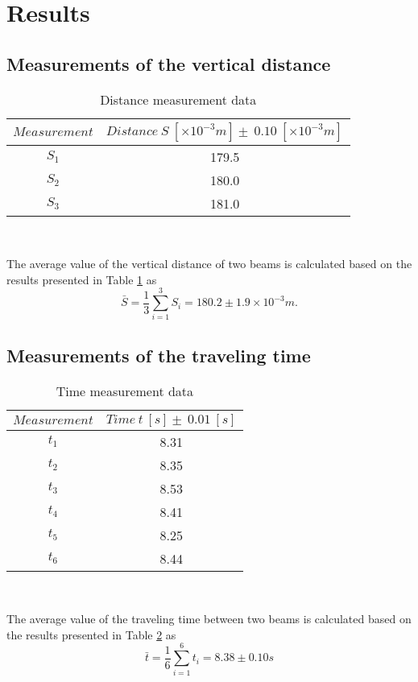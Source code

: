 \section{Results}
\subsection{Measurements of the vertical distance}
    \begin{table}[htbp]
        \centering
        \begin{tabular}{cc}
            \hline
            $Measurement$ & $Distance\ S\ [\times10^{-3}m] \pm\ 0.10\ [\times10^{-3}m]$\\
            \hline
            $S_1$ & 179.5\\
            $S_2$ & 180.0\\
            $S_3$ & 181.0\\     
            \hline
        \end{tabular}\\
        \caption{Distance measurement data}
        \label{distance}
    \end{table}
    The average value of the vertical distance of two beams is calculated  based on the results presented in Table \ref{distance} as
    \[
        \bar{S}=\frac{1}{3}\sum_{i=1}^{3}S_i=180.2\pm 1.9\times10^{-3}m.
    \]

\subsection{Measurements of the traveling time}
    \begin{table}[htbp]
        \centering
        \begin{tabular}{cc}
            \hline
            $Measurement$ & $Time\ t\ [s] \pm\ 0.01\ [s]$\\
            \hline
            $t_1$ & 8.31\\
            $t_2$ & 8.35\\
            $t_3$ & 8.53\\
            $t_4$ & 8.41\\
            $t_5$ & 8.25\\
            $t_6$ & 8.44\\
            \hline
        \end{tabular}\\
        \caption{Time measurement data}
        \label{time}
    \end{table}
    The average value of the traveling time between two beams is calculated  based on the results presented in Table \ref{time} as
    \[
        \bar{t}=\frac{1}{6}\sum_{i=1}^{6}t_i=8.38\pm 0.10s
    \]

